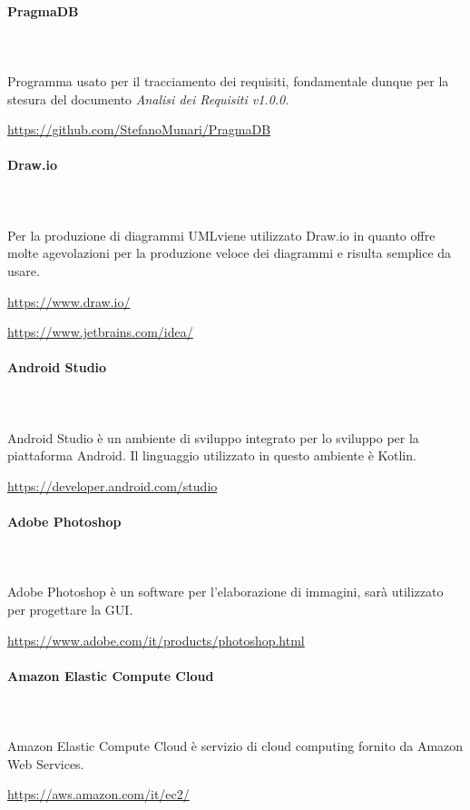 		\paragraph{PragmaDB} \mbox{}\\ \mbox{}\\
		Programma usato per il tracciamento dei requisiti, fondamentale dunque per la stesura del documento \textit{Analisi dei Requisiti v1.0.0}. \newline
		\centerline{\url{https://github.com/StefanoMunari/PragmaDB}}
		\paragraph{Draw.io} \mbox{}\\ \mbox{}\\
		Per la produzione di diagrammi UML\glosp viene utilizzato Draw.io in quanto offre molte agevolazioni per la produzione veloce dei diagrammi e risulta semplice da usare. \newline
		\centerline{\url{https://www.draw.io/}}
		\centerline{\url{https://www.jetbrains.com/idea/}}
		\paragraph{Android Studio} \mbox{}\\ \mbox{}\\
		Android Studio è un ambiente di sviluppo integrato per lo sviluppo per la piattaforma Android\glo. Il linguaggio utilizzato in questo ambiente è Kotlin\glo.
		 \newline
		\centerline{\url{https://developer.android.com/studio}}
		\paragraph{Adobe Photoshop} \mbox{}\\ \mbox{}\\
		Adobe Photoshop è un software per l'elaborazione di immagini, sarà utilizzato per progettare la GUI\glo.
		\newline
		\centerline{\url{https://www.adobe.com/it/products/photoshop.html}}
		\paragraph{Amazon Elastic Compute Cloud} \mbox{}\\ \mbox{}\\
		Amazon Elastic Compute Cloud è servizio di cloud computing fornito da Amazon Web Services.
		\newline
		\centerline{\url{https://aws.amazon.com/it/ec2/}}
